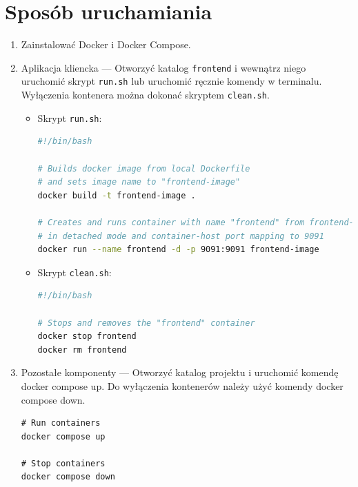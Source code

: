 \documentclass[12pt, a4paper]{report}
\begin{document}
\section{Sposób uruchamiania}
\begin{enumerate}
\item Zainstalować Docker i Docker Compose.
\item Aplikacja kliencka --- Otworzyć katalog \texttt{frontend} i wewnątrz niego uruchomić skrypt \texttt{run.sh} lub uruchomić ręcznie komendy w terminalu. Wyłączenia kontenera można dokonać skryptem \texttt{clean.sh}.
\begin{itemize}
\item Skrypt \texttt{run.sh}:
\begin{lstlisting}[language=bash]
#!/bin/bash

# Builds docker image from local Dockerfile
# and sets image name to "frontend-image"
docker build -t frontend-image .

# Creates and runs container with name "frontend" from frontend-image
# in detached mode and container-host port mapping to 9091
docker run --name frontend -d -p 9091:9091 frontend-image
\end{lstlisting}

\item Skrypt \texttt{clean.sh}:
\begin{lstlisting}[language=bash]
#!/bin/bash

# Stops and removes the "frontend" container
docker stop frontend
docker rm frontend
\end{lstlisting}

\end{itemize}
\item Pozostałe komponenty --- Otworzyć katalog projektu i uruchomić komendę docker compose up.
Do wyłączenia kontenerów należy użyć komendy docker compose down.
\begin{lstlisting}
# Run containers
docker compose up

# Stop containers
docker compose down
\end{lstlisting}
    
\end{enumerate}
\newpage
\end{document}
